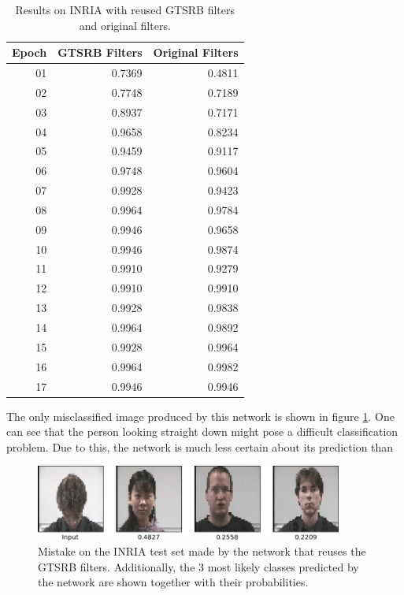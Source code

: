 \documentclass[11pt, a4paper]{article}
\begin{document}
\begin{table}[h!]
	\centering
	\begin{tabular}{|r|rr|}
		\hline
		Epoch & GTSRB Filters & Original Filters\\ \hline
		01 & 0.7369 & 0.4811\\
		02 & 0.7748 & 0.7189\\
		03 & 0.8937 & 0.7171\\
		04 & 0.9658 & 0.8234\\
		05 & 0.9459 & 0.9117\\
		06 & 0.9748 & 0.9604\\
		07 & 0.9928 & 0.9423\\
		08 & 0.9964 & 0.9784\\
		09 & 0.9946 & 0.9658\\
		10 & 0.9946 & 0.9874\\
		11 & 0.9910 & 0.9279\\
		12 & 0.9910 & 0.9910\\
		13 & 0.9928 & 0.9838\\
		14 & 0.9964 & 0.9892\\
		15 & 0.9928 & 0.9964\\
		16 & 0.9964 & 0.9982\\
		17 & 0.9946 & 0.9946\\ \hline
	\end{tabular}

	\caption{Results on INRIA with reused GTSRB filters and original filters. }
	\label{tab:inria-results}
\end{table}

The only misclassified image produced by this network is shown in figure \ref{fig:inria-filter-reuse-mistake}. One can see that the person looking straight down might pose a difficult classification problem. Due to this, the network is much less certain about its prediction than 

\begin{figure}[h!!!]
	\centering
	\includegraphics[width=0.9\textwidth]{images/inria_mistakes/mistake_looking_down}
	\caption{Mistake on the INRIA test set made by the network that reuses the GTSRB filters. Additionally, the 3 most likely classes predicted by the network are shown together with their probabilities.}
	\label{fig:inria-filter-reuse-mistake}
\end{figure}
\end{document}
